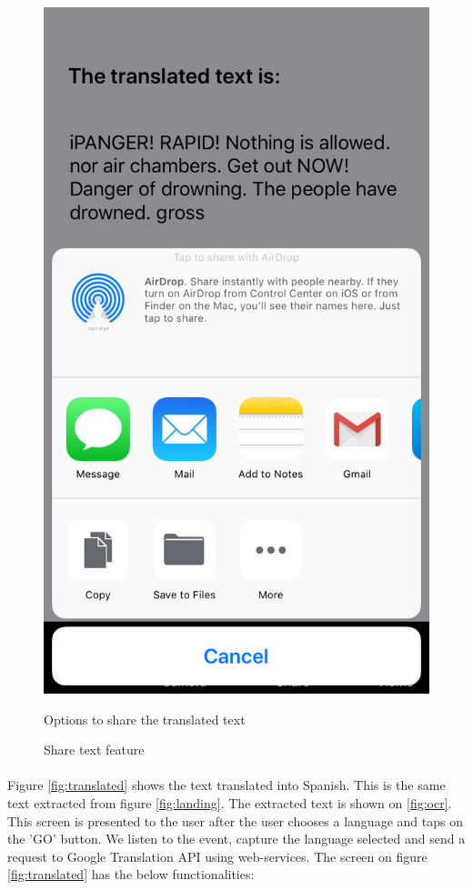\documentclass[12pt]{article}
\begin{document}
\begin{figure} [H]
\begin{minipage}{.5\textwidth}
  \includegraphics[width=0.9\linewidth]{media/4.PNG}
  \caption{Share text feature}{Options to share the translated text}
  \label{fig:share}
\end{minipage}
\end{figure}

\paragraph{}Figure \ref{fig:translated} shows the text translated into Spanish. This is the same text extracted from figure \ref{fig:landing}. The extracted text is shown on \ref{fig:ocr}. This screen is presented to the user after the user chooses a language and taps on the 'GO' button. We listen to the event, capture the language selected and send a request to Google Translation API using web-services. The screen on figure \ref{fig:translated} has the below functionalities:
\end{document}
